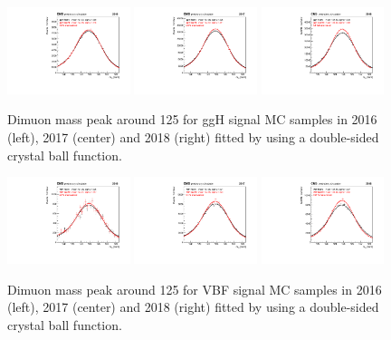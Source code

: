 \begin{figure}[h!]
    \centering
    \includegraphics[width=0.32\textwidth]{images_geofit/ggH_mass_geofit_2016.pdf}
    \includegraphics[width=0.32\textwidth]{images_geofit/ggH_mass_geofit_2017.pdf}
    \includegraphics[width=0.32\textwidth]{images_geofit/ggH_mass_geofit_2018.pdf}
    \caption{Dimuon mass peak around 125 \gev for ggH signal MC samples in 2016 (left), 2017 (center) and 2018 (right) fitted by using a double-sided crystal ball function.}
    \label{fig:dimu_mass_ggH}
\end{figure}

\begin{figure}[h!]
    \centering
    \includegraphics[width=0.32\textwidth]{images_geofit/VBF_mass_geofit_2016.pdf}
    \includegraphics[width=0.32\textwidth]{images_geofit/VBF_mass_geofit_2017.pdf}
    \includegraphics[width=0.32\textwidth]{images_geofit/VBF_mass_geofit_2018.pdf}
    \caption{Dimuon mass peak around 125 \gev for VBF signal MC samples in 2016 (left), 2017 (center) and 2018 (right) fitted by using a double-sided crystal ball function.}
    \label{fig:dimu_mass_VBF}
\end{figure}

